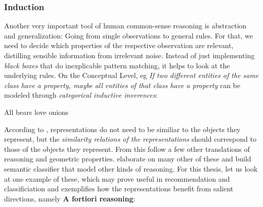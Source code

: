 \subsubsection*{Induction}

Another very important tool of human common-sense reasoning is abstraction and generalization: Going from single observations to general rules. For that, we need to decide which properties of the respective observation are relevant, distilling sensible information from irrelevant noise. Instead of just implementing \textit{black boxes} that do inexplicable pattern matching, it helps to look at the underlying rules. On the Conceptual Level, eg \textit{If two different entities of the same class have a property, maybe all entities of that class have a property} can be modeled through \textit{categorical inductive inverences}:

{All bears love onions \cite[226]{Gardenfors2000a}}





According to \textcite{Gardenfors2000a}, representations do not need to be similiar to the objects they represent, but the \textit{similarity relations of the representations} should correspond to those of the objects they represent. From this follow a few other translations of reasoning and geometric properties. \cite{Derrac2015} elaborate on many other of these and build semantic classifier that model other kinds of reasoning. For this thesis, let us look at one example of these, which may prove useful in recommendation and classificiation and exemplifies how the representations benefit from salient directions, namely \textbf{A fortiori reasoning}:
\vspace{2ex}

